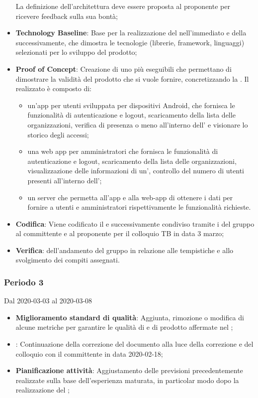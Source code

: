 \begin{itemize}
	La definizione dell'architettura deve essere proposta al proponente per ricevere feedback sulla sua bontà;
	\item \textbf{Technology Baseline}: Base per la realizzazione del  nell'immediato e della  successivamente, che dimostra le tecnologie (librerie, framework, linguaggi) selezionati per lo sviluppo del prodotto;
	\item \textbf{Proof of Concept}: Creazione di uno più eseguibili che permettano di dimostrare la validità del prodotto che si vuole fornire, concretizzando la .
	Il  realizzato è composto di:
	\begin{itemize}
		\item un'app per utenti sviluppata per dispositivi Android, che fornisca le funzionalità di autenticazione e logout, scaricamento della lista delle organizzazioni, verifica di presenza o meno all'interno dell' e visionare lo storico degli accessi;
		\item una web app per amministratori che fornisca le funzionalità di autenticazione e logout, scaricamento della lista delle organizzazioni, visualizzazione delle informazioni di un', controllo del numero di utenti presenti all'interno dell';
		\item un server che permetta all'app e alla web-app di ottenere i dati per fornire a utenti e amministratori rispettivamente le funzionalità richieste.
	\end{itemize}
	\item \textbf{Codifica}: Viene codificato il  e successivamente condiviso tramite i  del gruppo al committente e al proponente per il colloquio TB in data 3 marzo;
	\item \textbf{Verifica}:  dell'andamento del gruppo in relazione alle tempistiche e allo svolgimento dei compiti assegnati.
\end{itemize}

\subsubsection{Periodo 3} 
Dal 2020-03-03 al 2020-03-08
\begin{itemize}
	\item \textbf{Miglioramento standard di qualità}: Aggiunta, rimozione o modifica di alcune metriche per garantire le qualità di  e di prodotto affermate nel \PdQ{};
	\item \textbf{\AdR{}}: Continuazione della correzione del documento alla luce della correzione e del colloquio con il committente in data 2020-02-18;
	\item \textbf{Pianificazione attività}: Aggiustamento delle previsioni precedentemente realizzate sulla base dell'esperienza maturata, in particolar modo dopo la realizzazione del ;
\end{itemize}

